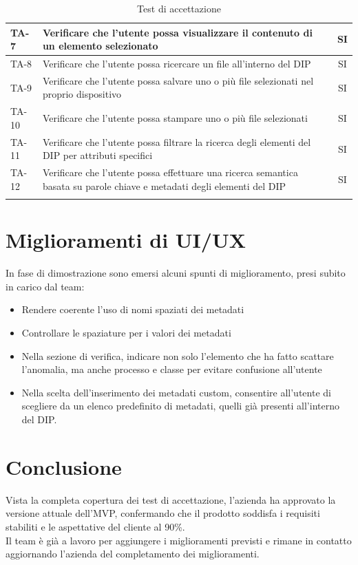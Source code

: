 \documentclass[a4paper,12pt]{article}
\begin{document}
\begin{longtable}{|p{1.5cm}|p{8.5cm}|c|}
    \hline
    TA-7            & Verificare che l'utente possa visualizzare il contenuto di un elemento selezionato                                       & SI                         \\
    \hline
    TA-8            & Verificare che l'utente possa ricercare un file all'interno del DIP                                                      & SI                         \\
    \hline
    TA-9            & Verificare che l'utente possa salvare uno o più file selezionati nel proprio dispositivo                                 & SI                         \\
    \hline
    TA-10           & Verificare che l'utente possa stampare uno o più file selezionati                                                        & SI                         \\
    \hline
    TA-11           & Verificare che l'utente possa filtrare la ricerca degli elementi del DIP per attributi specifici                         & SI                         \\
    \hline
    TA-12           & Verificare che l'utente possa effettuare una ricerca semantica basata su parole chiave e metadati degli elementi del DIP & SI                         \\
    \hline
    \rowcolor{white}
    \caption{Test di accettazione}
    \label{tab:test-accettazione}
\end{longtable}

\section{Miglioramenti di UI/UX}
In fase di dimostrazione sono emersi alcuni spunti di miglioramento, presi subito in carico dal team:
\begin{itemize}[noitemsep]
    \item Rendere coerente l'uso di nomi spaziati dei metadati
    \item Controllare le spaziature per i valori dei metadati
    \item Nella sezione di verifica, indicare non solo l'elemento che ha fatto scattare l'anomalia, ma anche processo e classe per evitare confusione all'utente
    \item Nella scelta dell'inserimento dei metadati custom, consentire all'utente di scegliere da un elenco predefinito di metadati, quelli già presenti all'interno del DIP.
\end{itemize}
\section{Conclusione}
Vista la completa copertura dei test di accettazione, l'azienda ha approvato la
versione attuale dell'MVP, confermando che il prodotto soddisfa i requisiti
stabiliti e le aspettative del cliente al 90\%. 
\\Il team è già a lavoro per aggiungere i miglioramenti previsti e rimane in contatto aggiornando l'azienda del completamento dei miglioramenti.
\end{document}
